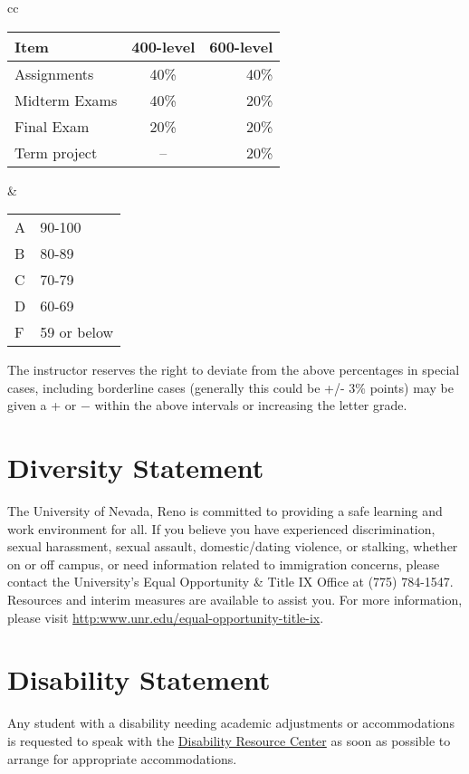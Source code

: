 \documentclass[11pt,onecolumn]{article}
\begin{document}
\begin{center}
\begin{tabular}{cc}
\begin{tabular}{l|c|r}	%
Item&400-level& 600-level\\\hline\hline
  Assignments&40\% & 40\%\\
  Midterm Exams&40\%& 20\%\\
  Final Exam&20\%& 20\%\\
  Term project &-- &20\%\\
\end{tabular}
&
\begin{tabular}{ll}
A&90-100\\
B&80-89\\
C&70-79\\
D&60-69\\
F&59 or below
\end{tabular}
\end{tabular}
\end{center}

The instructor reserves the right to deviate from the above percentages in special cases, including borderline cases (generally this could be +/- 3\% points) may be given a + or − within the above intervals or increasing the letter grade.

\section*{Diversity Statement}
The University of Nevada, Reno is committed to providing a safe learning and work environment for all. If you believe you have experienced discrimination, sexual harassment, sexual assault, domestic/dating violence, or stalking, whether on or off campus, or need information related to immigration concerns, please contact the University’s Equal Opportunity \& Title IX Office at (775) 784-1547. Resources and interim measures are available to assist you. For more information, please visit \url{http:www.unr.edu/equal-opportunity-title-ix}.

\section*{Disability Statement}
Any student with a disability needing academic adjustments or accommodations is requested to speak with the \href{http:www.unr.edu/drc}{Disability Resource Center} as soon as possible to arrange for appropriate accommodations.
\end{document}
